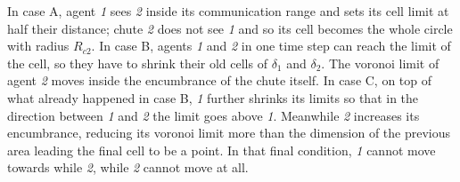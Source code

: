 In case A, agent \textit{1} sees \textit{2} inside its communication range and sets its cell limit at half their distance; chute \textit{2} does not see \textit{1} and so its cell becomes the whole circle with radius $R_{c2}$. In case B, agents \textit{1} and \textit{2} in one time step can reach the limit of the cell, so they have to shrink their old cells of $\delta_1$ and $\delta_2$. The voronoi limit of agent \textit{2} moves inside the encumbrance of the chute itself. In case C, on top of what already happened in case B, \textit{1} further shrinks its limits so that in the direction between \textit{1} and \textit{2} the limit goes above \textit{1}. Meanwhile \textit{2} increases its encumbrance, reducing its voronoi limit more than the dimension of the previous area leading the final cell to be a point. In that final condition, \textit{1} cannot move towards while \textit{2}, while \textit{2} cannot move at all.

